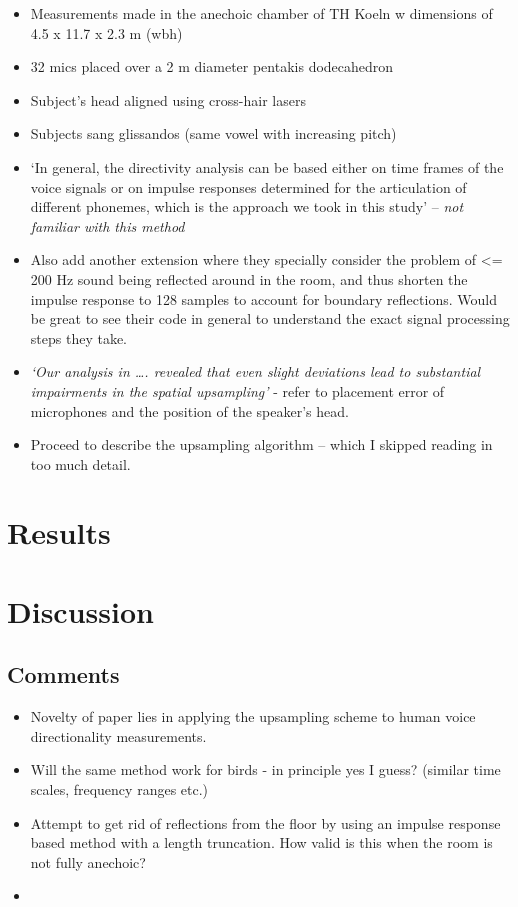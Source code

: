 \documentclass[
]{book}
\providecommand{\tightlist}{%
  \setlength{\itemsep}{0pt}\setlength{\parskip}{0pt}}
\begin{document}
\begin{itemize}
\tightlist
\item
  Measurements made in the anechoic chamber of TH Koeln w dimensions of 4.5 x 11.7 x 2.3 m (wbh)
\item
  32 mics placed over a 2 m diameter pentakis dodecahedron
\item
  Subject's head aligned using cross-hair lasers
\item
  Subjects sang glissandos (same vowel with increasing pitch)
\item
  `In general, the directivity analysis can be based either on time frames of the voice signals or on impulse responses determined for the articulation of different phonemes, which is the approach we took in this study' -- \emph{not familiar with this method}
\item
  Also add another extension where they specially consider the problem of \textless= 200 Hz sound being reflected around in the room, and thus shorten the impulse response to 128 samples to account for boundary reflections. Would be great to see their code in general to understand the exact signal processing steps they take.
\item
  \emph{`Our analysis in \ldots. revealed that even slight deviations lead to substantial impairments in the spatial upsampling'} - refer to placement error of microphones and the position of the speaker's head.
\item
  Proceed to describe the upsampling algorithm -- which I skipped reading in too much detail.
\end{itemize}

\hypertarget{results-15}{%
\section{Results}\label{results-15}}

\hypertarget{discussion-10}{%
\section{Discussion}\label{discussion-10}}

\hypertarget{comments-14}{%
\subsection{Comments}\label{comments-14}}

\begin{itemize}
\tightlist
\item
  Novelty of paper lies in applying the upsampling scheme to human voice directionality measurements.
\item
  Will the same method work for birds - in principle yes I guess? (similar time scales, frequency ranges etc.)
\item
  Attempt to get rid of reflections from the floor by using an impulse response based method with a length truncation. How valid is this when the room is not fully anechoic?
\item
\end{itemize}
\end{document}
